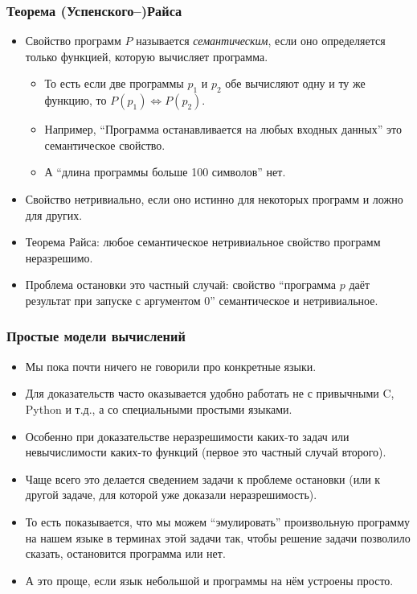 \documentclass[10pt]{beamer}
\begin{document}
\begin{frame}
    \frametitle{Теорема (Успенского--)Райса}
    \begin{itemize}
        \item Свойство программ $P$ называется \emph{семантическим}, если оно определяется только функцией, которую вычисляет программа.
        \begin{itemize}
            \item То есть если две программы $p_1$ и $p_2$ обе вычисляют одну и ту же функцию, то $P(p_1) \Leftrightarrow P(p_2)$.
            \pause
            \item Например, \enquote{Программа останавливается на любых входных данных} это \pause семантическое свойство.
            \item А \enquote{длина программы больше 100 символов} \pause нет.
        \end{itemize}
        \pause
        \item Свойство нетривиально, если оно истинно для некоторых программ и ложно для других.
        \item Теорема Райса: любое семантическое нетривиальное свойство программ неразрешимо.
        \pause
        \item Проблема остановки это частный случай: свойство \enquote{программа $p$ даёт результат при запуске с аргументом $0$} семантическое и нетривиальное.
    \end{itemize}
\end{frame}

\begin{frame}
    \frametitle{Простые модели вычислений}
    \begin{itemize}
        \item Мы пока почти ничего не говорили про конкретные языки.
        \item Для доказательств часто оказывается удобно работать не с привычными C, Python и т.д., а со специальными простыми языками.
        \item Особенно при доказательстве неразрешимости каких-то задач или невычислимости каких-то функций \pause (первое это частный случай второго).
        \item Чаще всего это делается сведением задачи к проблеме остановки (или к другой задаче, для которой уже доказали неразрешимость).
        \item То есть показывается, что мы можем \enquote{эмулировать} произвольную программу на нашем языке в терминах этой задачи так, чтобы решение задачи позволило сказать, остановится программа или нет.
        \item А это проще, если язык небольшой и программы на нём устроены просто.
    \end{itemize}
\end{frame}
\end{document}
